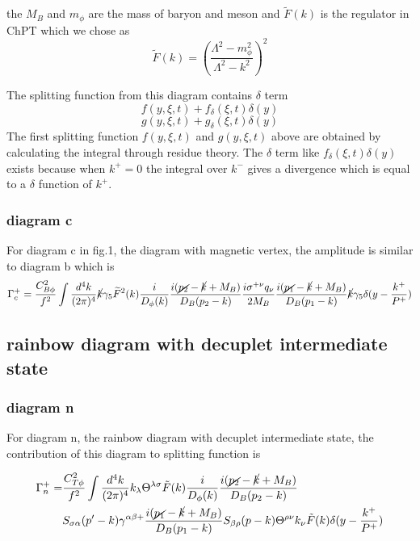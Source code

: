 \documentclass[preprintnumbers,prd,superscriptaddress,preprint]{revtex4-1}
\begin{document}
	the $M_{B}$ and $m_{\phi}$ are the mass of baryon and meson and
	$\widetilde{F}(k)$ is the regulator in ChPT which we chose as 
	\[
	\widetilde{F}(k)=\left(\frac{\Lambda^{2}-m_{\phi}^{2}}{\Lambda^{2}-k^{2}}\right)^{2}
	\]
	
	The splitting function from this diagram contains $\delta$ term 
	\[
	f(y,\xi,t)+f_{\delta}(\xi,t)\delta(y)
	\]
	\[g(y,\xi,t)+g_{\delta}(\xi,t)\delta(y)
	\]
	The first splitting function $f(y,\xi,t)$ and $g(y,\xi,t)$ above are obtained by calculating the integral through residue theory. The $\delta$ term like $f_{\delta}(\xi,t)\delta(y)$ exists because when $k^{+}=0$ the integral over $k^{-}$ gives a divergence which is equal to a $\delta$ function of $k^{+}$.
	
	
	\subsubsection{diagram c }
	
	For diagram c in fig.1, the diagram with magnetic vertex, the amplitude
	is similar to diagram b which is
	\begin{align}
		\Gamma_{c}^{+}=\frac{C_{B\phi}^{2}}{f^{2}}\int\frac{d^{4}k}{(2\pi)^{4}}\cancel{k}\gamma_{5}\widetilde{F}^{2}(k)\frac{i}{D_{\phi}(k)}\frac{i(\cancel{p_{2}}-\cancel{k}+M_{B})}{D_{B}(p_{2}-k)}\frac{i\sigma^{+\nu}q_{\nu}}{2M_{B}}\frac{i(\cancel{p_{1}}-\cancel{k}+M_{B})}{D_{B}(p_{1}-k)}\cancel{k}\gamma_{5}\delta(y-\frac{k^{+}}{P^{+}})
	\end{align}
	
	
	\subsection{rainbow diagram with decuplet intermediate state}
	
	\subsubsection{diagram n}
	
	For diagram n, the rainbow diagram with decuplet intermediate state,
	the contribution of this diagram to splitting function is 
	
	\begin{align*}
		\Gamma_{n}^{+}= & \frac{C_{T\phi}^{2}}{f^{2}}\int\frac{d^{4}k}{(2\pi)^{4}}k_{\lambda}\Theta^{\lambda\sigma}\tilde{F}(k)\frac{i}{D_{\phi}(k)}\frac{i(\cancel{p_{2}}-\cancel{k}+M_{B})}{D_{B}(p_{2}-k)}\\
		& S_{\sigma\alpha}(p'-k)\gamma^{\alpha\beta+}\frac{i(\cancel{p_{1}}-\cancel{k}+M_{B})}{D_{B}(p_{1}-k)}S_{\beta\rho}(p-k)\Theta^{\rho\nu}k_{\nu}\tilde{F}(k)\delta(y-\frac{k^{+}}{P^{+}})
	\end{align*}
	
\end{document}
